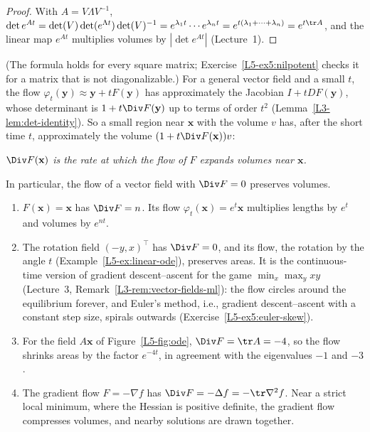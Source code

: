 \begin{proof}
    With $A = V\Lambda V^{-1}$, $\det e^{At} = \det(V)\det(e^{\Lambda t})\det(V)^{-1} = e^{\lambda_1 t}\cdots e^{\lambda_n t} = e^{t(\lambda_1 + \cdots + \lambda_n)} = e^{t\tr A}$, and the linear map $e^{At}$ multiplies volumes by $|\det e^{At}|$ (Lecture~1).
\end{proof}

(The formula holds for every square matrix; Exercise~\ref{L5-ex5:nilpotent} checks it for a matrix that is not diagonalizable.) For a general vector field and a small $t$, the flow $\varphi_t(\mathbf{y}) \approx \mathbf{y} + tF(\mathbf{y})$ has approximately the Jacobian $I + tDF(\mathbf{y})$, whose determinant is $1 + t\Div F(\mathbf{y})$ up to terms of order $t^2$ (Lemma~\ref{L3-lem:det-identity}). So a small region near $\mathbf{x}$ with the volume $v$ has, after the short time $t$, approximately the volume $(1 + t\Div F(\mathbf{x}))v$:
\begin{center}
    \emph{$\Div F(\mathbf{x})$ is the rate at which the flow of $F$ expands volumes near $\mathbf{x}$.}
\end{center}
In particular, the flow of a vector field with $\Div F = 0$ preserves volumes.

\begin{example}\label{L5-ex:flow-volumes}
    \begin{enumerate}
        \item $F(\mathbf{x}) = \mathbf{x}$ has $\Div F = n$. Its flow $\varphi_t(\mathbf{x}) = e^t\mathbf{x}$ multiplies lengths by $e^t$ and volumes by $e^{nt}$.
        \item The rotation field $(-y, x)^\top$ has $\Div F = 0$, and its flow, the rotation by the angle $t$ (Example~\ref{L5-ex:linear-ode}), preserves areas. It is the continuous-time version of gradient descent--ascent for the game $\min_x\max_y xy$ (Lecture~3, Remark~\ref{L3-rem:vector-fields-ml}): the flow circles around the equilibrium forever, and Euler's method, i.e., gradient descent--ascent with a constant step size, spirals outwards (Exercise~\ref{L5-ex5:euler-skew}).
        \item For the field $A\mathbf{x}$ of Figure~\ref{L5-fig:ode}, $\Div F = \tr A = -4$, so the flow shrinks areas by the factor $e^{-4t}$, in agreement with the eigenvalues $-1$ and $-3$.
        \item The gradient flow $F = -\nabla f$ has $\Div F = -\Delta f = -\tr\nabla^2 f$. Near a strict local minimum, where the Hessian is positive definite, the gradient flow compresses volumes, and nearby solutions are drawn together.
    \end{enumerate}
\end{example}

